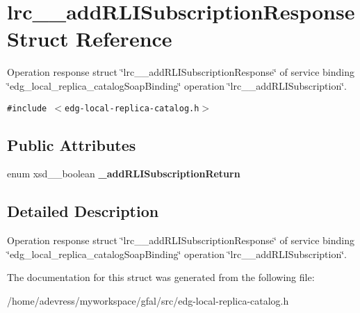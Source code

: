 \section{lrc\_\-\_\-add\-RLISubscription\-Response Struct Reference}
\label{structlrc____addRLISubscriptionResponse}
Operation response struct \char`\"{}lrc\_\-\_\-add\-RLISubscription\-Response\char`\"{} of service binding \char`\"{}edg\_\-local\_\-replica\_\-catalog\-Soap\-Binding\char`\"{} operation \char`\"{}lrc\_\-\_\-add\-RLISubscription\char`\"{}.  


{\tt \#include $<$edg-local-replica-catalog.h$>$}

\subsection*{Public Attributes}
\begin{CompactItemize}
\item 
enum xsd\_\-\_\-boolean \textbf{\_\-add\-RLISubscription\-Return}\label{structlrc____addRLISubscriptionResponse_83eb81165463760fb4517e3564b53be9}

\end{CompactItemize}


\subsection{Detailed Description}
Operation response struct \char`\"{}lrc\_\-\_\-add\-RLISubscription\-Response\char`\"{} of service binding \char`\"{}edg\_\-local\_\-replica\_\-catalog\-Soap\-Binding\char`\"{} operation \char`\"{}lrc\_\-\_\-add\-RLISubscription\char`\"{}. 



The documentation for this struct was generated from the following file:\begin{CompactItemize}
\item 
/home/adevress/myworkspace/gfal/src/edg-local-replica-catalog.h\end{CompactItemize}
